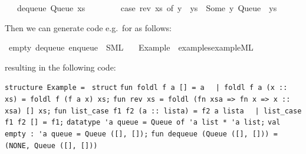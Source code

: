 \begin{isabellebody}
\ \ {\isacharbar}\ {\isachardoublequoteopen}dequeue\ {\isacharparenleft}Queue\ xs\ {\isacharbrackleft}{\isacharbrackright}{\isacharparenright}\ {\isacharequal}\isanewline
\ \ \ \ \ \ {\isacharparenleft}case\ rev\ xs\ of\ y\ {\isacharhash}\ ys\ {\isasymRightarrow}\ {\isacharparenleft}Some\ y{\isacharcomma}\ Queue\ {\isacharbrackleft}{\isacharbrackright}\ ys{\isacharparenright}{\isacharparenright}{\isachardoublequoteclose}%
\endisatagquote
{\isafoldquote}%
%
\isadelimquote
%
\endisadelimquote
%
\begin{isamarkuptext}%
\noindent Then we can generate code e.g.~for  as follows:%
\end{isamarkuptext}%
\isamarkuptrue%
%
\isadelimquote
%
\endisadelimquote
%
\isatagquote
{}\isamarkupfalse%
\ empty\ dequeue\ enqueue\ \ SML\isanewline
\ \ \ Example\ \ {\isachardoublequoteopen}examples{\isacharslash}example{\isachardot}ML{\isachardoublequoteclose}%
\endisatagquote
{\isafoldquote}%
%
\isadelimquote
%
\endisadelimquote
%
\begin{isamarkuptext}%
\noindent resulting in the following code:%
\end{isamarkuptext}%
\isamarkuptrue%
%
\isadelimquote
%
\endisadelimquote
%
\isatagquote
%
\begin{isamarkuptext}%
\isaverbatim%
\noindent%
\verb|structure Example = |\newline%
\verb|struct|\newline%
\newline%
\verb|fun foldl f a [] = a|\newline%
\verb|  |\verb,|,\verb| foldl f a (x :: xs) = foldl f (f a x) xs;|\newline%
\newline%
\verb|fun rev xs = foldl (fn xsa => fn x => x :: xsa) [] xs;|\newline%
\newline%
\verb|fun list_case f1 f2 (a :: lista) = f2 a lista|\newline%
\verb|  |\verb,|,\verb| list_case f1 f2 [] = f1;|\newline%
\newline%
\verb|datatype 'a queue = Queue of 'a list * 'a list;|\newline%
\newline%
\verb|val empty : 'a queue = Queue ([], []);|\newline%
\newline%
\verb|fun dequeue (Queue ([], [])) = (NONE, Queue ([], []))|\newline%

\end{isamarkuptext}
\end{isabellebody}
